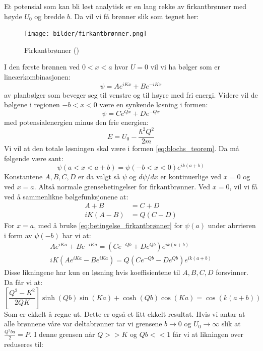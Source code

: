 \documentclass{article}
\begin{document}
Et potensial som kan bli løst analytisk er en lang rekke av firkantbrønner med høyde $U_0$ og bredde $b$. Da vil vi få brønner slik som tegnet her:
\begin{figure}[H]
    \centering
    \texttt{[image: bilder/firkantbrønner.png]}
    \caption{Firkantbrønner (\cite{kittel_solid_state_physics})}
    \label{fig:firkantbrønner}
\end{figure}
I den første brønnen ved $0 < x < a$ hvor $U = 0$ vil vi ha bølger som er lineærkombinasjonen:
\begin{equation}
    \psi = Ae^{iKx} + Be^{-iKx}
\end{equation}
av planbølger som beveger seg til venstre og til høyre med fri energi. Videre vil de bølgene i regionen $-b < x < 0$ være en synkende løsning i formen:
\begin{equation}
    \psi = Ce^{Qx} + De^{-Qx}
\end{equation}
med potensialenergien minus den frie energien:
\begin{equation}
    E = U_0 - \frac{\hbar^2 Q^2}{2m} 
\end{equation}
Vi vil at den totale løsningen skal være i formen \ref{eq:blochs_teorem}. Da må følgende være sant:
\begin{equation}
    \label{eq:betingelse_firkantbrønner}
    \psi(a < x < a + b) = \psi(-b < x < 0)e^{ik(a+b)}
\end{equation}
Konstantene $A, B, C, D$ er da valgt så $\psi$ og $d\psi / dx$ er kontinuerlige ved $x = 0$ og ved $x = a$. Altså normale grensebetingelser for firkantbrønner. Ved $x = 0$, vil vi få ved å sammenlikne bølgefunksjonene at:
\begin{align}
    A + B &= C + D \\
    iK(A-B) &= Q(C-D)
\end{align}
For $x=a$, med å bruke \ref{eq:betingelse_firkantbrønner} for $\psi(a)$ under abrrieren i form av $\psi(-b)$ har vi at:
\begin{align}
    Ae^{iKa} + Be^{-iKa} = (Ce^{-Qb}+De^{Qb}) e^{ik(a+b)} \\
    iK(Ae^{iKa} - Be^{iKa}) = Q(Ce^{-Qb}-De^{Qb}) e^{ik(a+b)}
\end{align}
Disse likningene har kun en løsning hvis koeffisientene til $A,B,C,D$ forsvinner. Da får vi at:
\begin{equation}
    \left[\frac{Q^2-K^2}{2QK}\right] \sinh(Qb) \sin(Ka) + \cosh(Qb) \cos(Ka) = \cos(k(a+b))
\end{equation}
Som er ekkelt å regne ut. Dette er også et litt ekkelt resultat. Hvis vi antar at alle brønnene våre var deltabrønner tar vi grensene $b \rightarrow 0$ og $U_0 \rightarrow \infty$ slik at $\frac{Q^2 ba}{2}=P$. I denne grensen når $Q >> K$ og $Qb << 1$ får vi at likningen over reduseres til:
\end{document}
